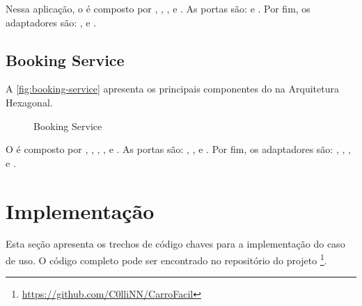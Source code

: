 Nessa aplicação, o  é composto por , , ,  e . As portas são:  e . Por fim, os adaptadores são: ,  e .

\subsection{Booking Service}
A \autoref{fig:booking-service} apresenta os principais componentes do  na Arquitetura Hexagonal.

\begin{figure}[H]
    \centering
    \caption{Booking Service}
    \label{fig:booking-service}
\end{figure}

O  é composto por , , , ,  e . As portas são: , ,  e . Por fim, os adaptadores são: , , ,  e .

\section{Implementação}
Esta seção apresenta os trechos de código chaves para a implementação do caso de uso. O código completo pode ser encontrado no repositório do projeto \footnote{\url{https://github.com/C0lliNN/CarroFacil}}.

